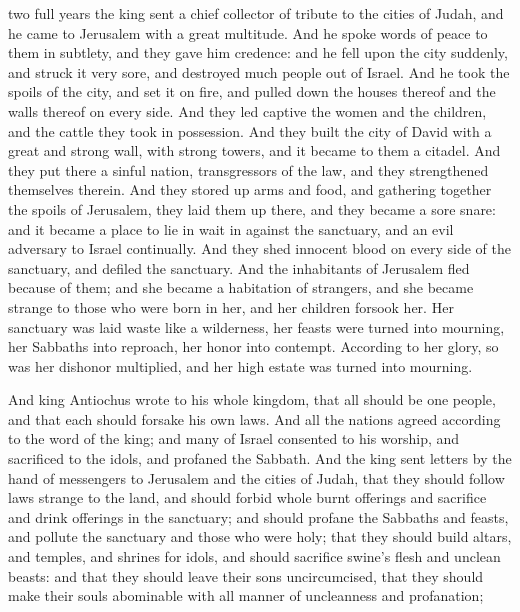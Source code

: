 { two full years the king sent a chief collector of tribute to the cities of Judah, and he came to Jerusalem with a
 great multitude.
And he spoke words of peace to them in subtlety, and they gave him credence: and he fell upon the city suddenly, and struck it very sore, and destroyed much people out of Israel.
And he took the spoils of the city, and set it on fire, and pulled down the houses thereof and the walls thereof on every side.
And they led captive the women and the children, and the cattle they took in possession.
And they built the city of David with a great and strong wall, with strong towers, and it became to them a citadel.
And they put there a sinful nation, transgressors of the law, and they strengthened themselves therein.
And they stored up arms and food, and gathering together the spoils of Jerusalem, they laid them up there, and they became a sore snare:
and it became a place to lie in wait in against the sanctuary, and an evil adversary to Israel continually.
And they shed innocent blood on every side of the sanctuary, and defiled the sanctuary.
And the inhabitants of Jerusalem fled because of them; and she became a habitation of strangers, and she became strange to those who were born in her, and her children forsook her.
Her sanctuary was laid waste like a wilderness,
 her feasts were turned into mourning, her Sabbaths into reproach, her honor into contempt.
According to her glory, so was her dishonor multiplied, and her high estate was turned into mourning.
\par }{\PP {}And king Antiochus wrote to his whole kingdom, that all should be one people,
and that each should forsake his own laws. And all the nations agreed according to the word of the king;
and many of Israel consented to his worship, and sacrificed to the idols, and profaned the Sabbath.
And the king sent letters by the hand of messengers to Jerusalem and the cities of Judah, that they should follow laws strange to the land,
and should forbid whole burnt offerings and sacrifice and drink offerings in the sanctuary; and should profane the Sabbaths and feasts,
and pollute the sanctuary and those who were holy;
that they should build altars, and temples, and shrines for idols, and should sacrifice swine’s flesh and unclean beasts:
and that they should leave their sons uncircumcised, that they should make their souls abominable with all manner of uncleanness and profanation;
}
